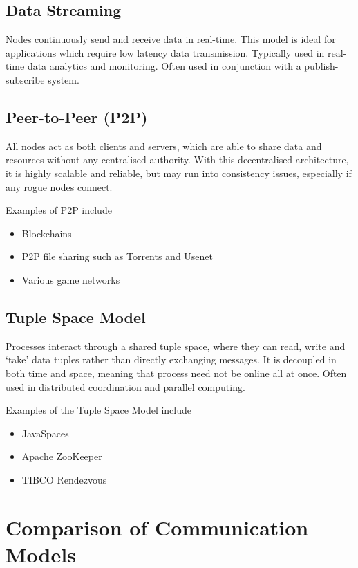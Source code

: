 \subsection*{Data Streaming}

Nodes continuously send and receive data in real-time. This model is ideal for applications which require low latency data transmission. Typically used in real-time data analytics and monitoring. Often used in conjunction with a publish-subscribe system.

\subsection*{Peer-to-Peer (P2P)}

All nodes act as both clients and servers, which are able to share data and resources without any centralised authority. With this decentralised architecture, it is highly scalable and reliable, but may run into consistency issues, especially if any rogue nodes connect.

Examples of P2P include
\begin{itemize}
  \item Blockchains
  \item P2P file sharing such as Torrents and Usenet
  \item Various game networks
\end{itemize}

\subsection*{Tuple Space Model}

Processes interact through a shared tuple space, where they can read, write and `take' data tuples rather than directly exchanging messages. It is decoupled in both time and space, meaning that process need not be online all at once. Often used in distributed coordination and parallel computing.

Examples of the Tuple Space Model include
\begin{itemize}
  \item JavaSpaces
  \item Apache ZooKeeper
  \item TIBCO Rendezvous
\end{itemize}

\section*{Comparison of Communication Models}

